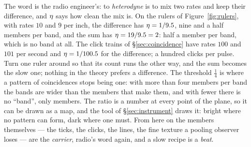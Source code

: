The word is the radio engineer's: to \emph{heterodyne} is to mix two rates
and keep their difference, and $\eta$ says how clean the mix is. On the
rulers of Figure~\ref{fig:rulers}, with rates $10$ and $9$ per inch, the
difference has $\eta=1/9.5$, nine and a half members per band, and the sum
has $\eta=19/9.5=2$: half a member per band, which is no band at all. The
click trains of \S\ref{sec:coincidence} have rates $100$ and $101$ per
second and $\eta=1/100.5$ for the difference; a hundred clicks per pulse.
Turn one ruler around so that its count runs the other way, and the sum
becomes the slow one; nothing in the theory prefers a difference. The
threshold $\tfrac14$ is where a pattern of coincidences stops being one:
with more than four members per band the bands are wider than the members
that make them, and with fewer there is no ``band'', only members. The
ratio is a number at every point of the plane, so it can be drawn as a map,
and the tool of \S\ref{sec:instrument} draws it: bright where no pattern can
form, dark where one must. From here on the members themselves --- the
ticks, the clicks, the lines, the fine texture a pooling observer loses ---
are the \emph{carrier}, radio's word again, and a slow recipe is a
\emph{beat}.


